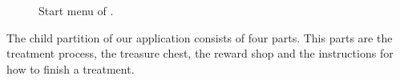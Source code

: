 \begin{figure}[H]
	\centering
	\caption{Start menu of \app{}.}
	\label{fig:asthmapp-main-menu}
\end{figure}

The child partition of our application consists of four parts. This parts are the treatment process, the treasure chest, the reward shop and the instructions for how to finish a treatment.

